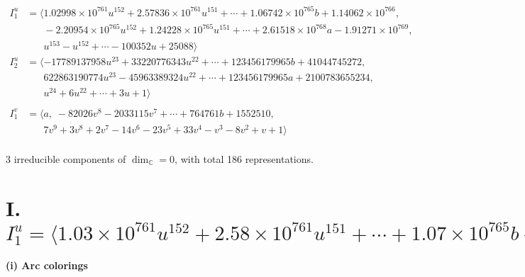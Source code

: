 \documentclass[1p]{elsarticle_modified}
\theoremstyle{definition}
\begin{document}
\begin{align*}
I^u_{1}&=\langle 
1.02998\times10^{761} u^{152}+2.57836\times10^{761} u^{151}+\cdots+1.06742\times10^{765} b+1.14062\times10^{766},\\
\phantom{I^u_{1}}&\phantom{= \langle  }-2.20954\times10^{765} u^{152}+1.24228\times10^{765} u^{151}+\cdots+2.61518\times10^{768} a-1.91271\times10^{769},\\
\phantom{I^u_{1}}&\phantom{= \langle  }u^{153}- u^{152}+\cdots-100352 u+25088\rangle \\
I^u_{2}&=\langle 
-17789137958 u^{23}+33220776343 u^{22}+\cdots+123456179965 b+41044745272,\\
\phantom{I^u_{2}}&\phantom{= \langle  }622863190774 u^{23}-45963389324 u^{22}+\cdots+123456179965 a+2100783655234,\\
\phantom{I^u_{2}}&\phantom{= \langle  }u^{24}+6 u^{22}+\cdots+3 u+1\rangle \\
\\
I^v_{1}&=\langle 
a,\;-82026 v^8-2033115 v^7+\cdots+764761 b+1552510,\\
\phantom{I^v_{1}}&\phantom{= \langle  }7 v^9+3 v^8+2 v^7-14 v^6-23 v^5+33 v^4- v^3-8 v^2+v+1\rangle \\
\end{align*}
\raggedright * 3 irreducible components of $\dim_{\mathbb{C}}=0$, with total 186 representations.\\
\newpage
\renewcommand{\arraystretch}{1}
\centering \section*{I. $I^u_{1}= \langle 1.03\times10^{761} u^{152}+2.58\times10^{761} u^{151}+\cdots+1.07\times10^{765} b+1.14\times10^{766},\;-2.21\times10^{765} u^{152}+1.24\times10^{765} u^{151}+\cdots+2.62\times10^{768} a-1.91\times10^{769},\;u^{153}- u^{152}+\cdots-100352 u+25088 \rangle$}
\flushleft \textbf{(i) Arc colorings}\\
\end{document}
